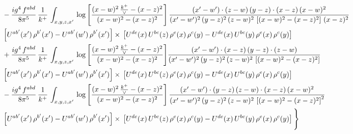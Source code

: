 \documentclass[9pt]{article}
\numberwithin{equation}{section}
\begin{document}
\begin{align}
& - \frac{ig^{4}\, f^{abd}}{8\pi^{5}}\, \frac{1}{k^{+}}\, \int_{x,y,z,x'}\,\log{\left[\frac{(x-w)^{2}\,\frac{k^{+}}{\vee}-(x-z)^{2}}{(x-w)^{2}-(x-z)^{2}}\right]}\,\frac{(x'-w')\cdot (z-w)\, (y-z)\cdot (x-z)\, (x-w)^{2}}{(x'-w')^{2}\, (y-z)^{2}\, (z-w)^{2}\,\left[(x-w)^{2} - (x-z)^{2}\right]\, (x-z)^{2}}\, \notag \\ & \left[U^{ab'}(x')\,\rho^{b'}(x')-U^{ab'}(w')\, \rho^{b'}(x')\right]\times\,\left[U^{de}(x)\,U^{bc}(z)\, \rho^{e}(x)\,\rho^{c}(y)-U^{de}(x)\,U^{bc}(y)\,\rho^{e}(x)\,\rho^{c}(y)\right] \notag \\
& +\frac{ig^{4}\, f^{abd}}{8\pi^{5}}\, \frac{1}{k^{+}}\, \int_{x,y,z,x'}\,\log{\left[\frac{(x-w)^{2}\,\frac{k^{+}}{\vee}-(x-z)^{2}}{(x-w)^{2}-(x-z)^{2}}\right]}\frac{(x'-w')\cdot (x-z)\, (y-z)\cdot (z-w)}{(x'-w')^{2}\, (y-z)^{2}\, (z-w)^{2}\,\left[(x-w)^{2} -(x-z)^{2}\right]}\, \notag \\ & \left[U^{ab'}(x')\,\rho^{b'}(x')-U^{ab'}(w')\, \rho^{b'}(x')\right]\times\,\left[U^{de}(x)\,U^{bc}(z)\, \rho^{e}(x)\,\rho^{c}(y)-U^{de}(x)\,U^{bc}(y)\,\rho^{e}(x)\,\rho^{c}(y)\right] \notag \\
& -\frac{ig^{4}\, f^{abd}}{8\pi^{5}}\, \frac{1}{k^{+}}\, \int_{x,y,z,x'}\,\log{\left[\frac{(x-w)^{2}\,\frac{k^{+}}{\vee}-(x-z)^{2}}{(x-w)^{2}-(x-z)^{2}}\right]}\,\frac{(x'-w')\cdot (y-z)\, (z-w)\cdot (x-z)\,(x-w)^{2}}{(x'-w')^{2}\, (y-z)^{2}\, (z-w)^{2}\,\left[(x-w)^{2}-(x-z)^{2}\right]^{2}}\, \notag \\ & \left[U^{ab'}(x')\,\rho^{b'}(x')-U^{ab'}(w')\, \rho^{b'}(x')\right]\times\,\left[U^{de}(x)\,U^{bc}(z)\, \rho^{e}(x)\,\rho^{c}(y)-U^{de}(x)\,U^{bc}(y)\,\rho^{e}(x)\,\rho^{c}(y)\right]\Bigg\}
\end{align}
\end{document}
